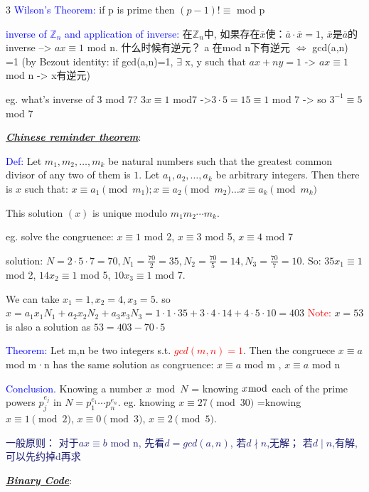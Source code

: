 \documentclass[12pt]{article}
\newcommand{\bulletPoint}[1]{\underline{\textit{\textbf{#1}}}}
\begin{document}
\begin{multicols*}{3}
\textcolor{blue}{Wilson's Theorem:} if p is prime then $(p-1)!\equiv$ mod p

\textcolor{blue}{inverse of $\mathbb{Z}_n$ and application of inverse:} 在$\mathbb{Z}_n$中, 如果存在$\overline{x}$使：$\overline{a}·\overline{x}=1$, $\overline{x}$是$\overline{a}$的 inverse --> $ax\equiv 1$ mod n. 
什么时候有逆元？ a 在mod n下有逆元 $\Longleftrightarrow$ gcd(a,n) =1 (by Bezout identity: if gcd(a,n)=1, $\exists$ x, y such that $ax+ny=1$ -> $ax\equiv 1$ mod n -> x有逆元)

eg. what's inverse of 3 mod 7?  $3x\equiv 1$ mod7 ->$3·5=15\equiv 1$ mod 7 -> so $3^{-1}\equiv5 $ mod 7 



\bulletPoint{Chinese reminder theorem}:

\textcolor{blue}{Def:}
Let $m_1,m_2,\ldots,m_k$ be natural numbers such that the greatest common divisor of any two of them is $1$.
Let $a_1,a_2,\ldots,a_k$ be arbitrary integers.
Then there is $x$ such that:
$x \equiv a_1 \pmod{m_1}; x \equiv a_2 \pmod{m_2} \hdots x \equiv a_k \pmod{m_k}$


This solution $(x)$ is unique modulo $m_1m_2\cdots m_k$.

eg. solve the congruence: $x\equiv1$ mod 2, $x\equiv3$ mod 5, $x\equiv4$ mod 7

solution: $N=2·5·7=70, N_1=\frac{70}{2}=35, N_2= \frac{70}{5}=14, N_3=\frac{70}{7}= 10$. So: $35x_1\equiv 1$ mod 2, $14x_2\equiv 1$ mod 5, $10x_3\equiv 1$ mod 7. 

We can take $x_1=1, x_2=4, x_3=5$. so $x=a_1x_1N_1+a_2x_2N_2+a_3x_3N_3=1·1·35+3·4·14+4·5·10=403$ \textcolor{red}{Note:} $x=53 $ is also a solution as $53=403-70·5$

\textcolor{blue}{Theorem:} Let m,n be two integers s.t. \textcolor{red}{$gcd(m,n)=1$}. Then the congruece $x\equiv a$ mod m·n has the same solution as congruence: $x\equiv a$ mod m , $x\equiv a$ mod n

\textcolor{blue}{Conclusion.} Knowing a number $x \bmod N$ = knowing $x \bmod$ each of the prime powers $p_j^{e_j}$ in
$N = p_1^{e_1} \cdots p_n^{e_n}$.
eg. knowing $x \equiv 27 \pmod{30}$ =knowing
$x \equiv 1 \pmod{2}$, $x \equiv 0 \pmod{3}$, $x \equiv 2 \pmod{5}$.

{\fontsize{5.5pt}{5pt}\selectfont\textcolor{MidnightBlue}{一般原则： 对于$ax\equiv b$ mod n, 先看$d=gcd(a,n)$, 若$d\nmid n$,无解； 若$d\mid n$,有解,可以先约掉d再求}}



\bulletPoint{Binary Code}:


\end{multicols*}
\end{document}
